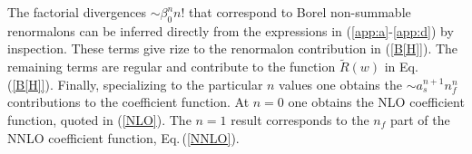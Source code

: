 \documentclass[aps,prd,twocolumn,a4paper,superscriptaddress,10pt,showpacs,notitlepage,floatfix]{revtex4-1}
\begin{document}
The factorial divergences  $\sim \beta_0^n  n!$ that correspond to Borel non-summable renormalons 
can be inferred directly from the expressions in (\ref{app:a}-\ref{app:d}) by inspection. 
These terms give rize to the renormalon contribution in (\ref{B[H]}). The remaining terms are regular and 
contribute to the function $\widetilde R(w)$ in Eq.\,(\ref{B[H]}). 
Finally, specializing to the particular $n$ values one obtains the $\sim a_s^{n+1}n_f^n$ contributions to the coefficient function. 
At $n=0$ one obtains the NLO coefficient function, quoted in (\ref{NLO}). 
The $n=1$ result corresponds to the $n_f$ part of the NNLO coefficient function, Eq.\,(\ref{NNLO}).

%


%
\end{document}
